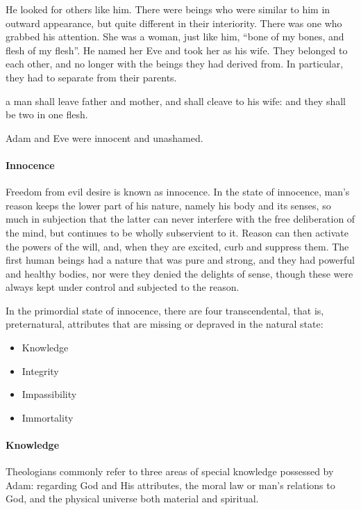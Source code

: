 He looked for others like him. There were beings who were similar to him in outward appearance, but quite different in their interiority. There was one who grabbed his attention. She was a woman, just like him, “bone of my bones, and flesh of my flesh”. He named her Eve and took her as his wife. They belonged to each other, and no longer with the beings they had derived from. In particular, they had to separate from their parents.

\begin{quotex}
a man shall leave father and mother, and shall cleave to his wife: and they shall be two in one flesh. 

\end{quotex}
Adam and Eve were innocent and unashamed.

\paragraph{Innocence}
\begin{quotex}
Freedom from evil desire is known as innocence. In the state of innocence, man's reason keeps the lower part of his nature, namely his body and its senses, so much in subjection that the latter can never interfere with the free deliberation of the mind, but continues to be wholly subservient to it. Reason can then activate the powers of the will, and, when they are excited, curb and suppress them. The first human beings had a nature that was pure and strong, and they had powerful and healthy bodies, nor were they denied the delights of sense, though these were always kept under control and subjected to the reason. 

\end{quotex}
In the primordial state of innocence, there are four transcendental, that is, preternatural, attributes that are missing or depraved in the natural state:

\begin{itemize}
\item Knowledge 
\item Integrity 
\item Impassibility 
\item Immortality 
\end{itemize}
\paragraph{Knowledge}
Theologians commonly refer to three areas of special knowledge possessed by Adam: regarding God and His attributes, the moral law or man's relations to God, and the physical universe both material and spiritual.

